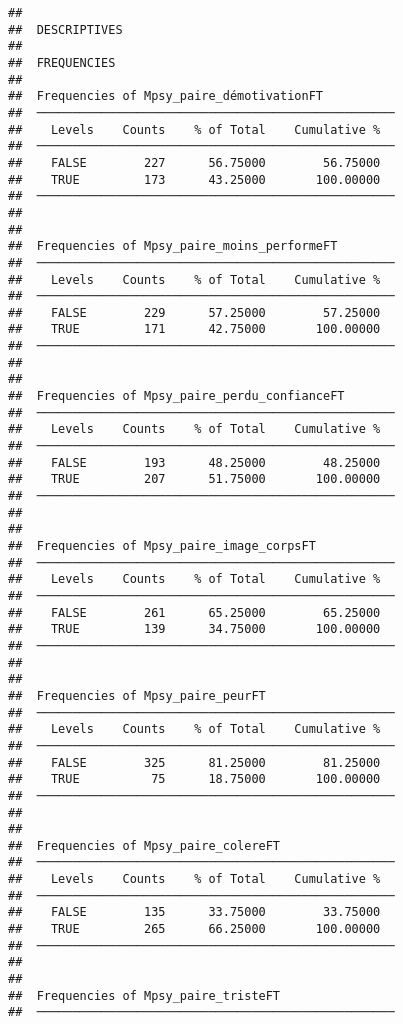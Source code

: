 \documentclass[
]{article}
\begin{document}
\begin{verbatim}
## 
##  DESCRIPTIVES
## 
##  FREQUENCIES
## 
##  Frequencies of Mpsy_paire_démotivationFT           
##  ────────────────────────────────────────────────── 
##    Levels    Counts    % of Total    Cumulative %   
##  ────────────────────────────────────────────────── 
##    FALSE        227      56.75000        56.75000   
##    TRUE         173      43.25000       100.00000   
##  ────────────────────────────────────────────────── 
## 
## 
##  Frequencies of Mpsy_paire_moins_performeFT         
##  ────────────────────────────────────────────────── 
##    Levels    Counts    % of Total    Cumulative %   
##  ────────────────────────────────────────────────── 
##    FALSE        229      57.25000        57.25000   
##    TRUE         171      42.75000       100.00000   
##  ────────────────────────────────────────────────── 
## 
## 
##  Frequencies of Mpsy_paire_perdu_confianceFT        
##  ────────────────────────────────────────────────── 
##    Levels    Counts    % of Total    Cumulative %   
##  ────────────────────────────────────────────────── 
##    FALSE        193      48.25000        48.25000   
##    TRUE         207      51.75000       100.00000   
##  ────────────────────────────────────────────────── 
## 
## 
##  Frequencies of Mpsy_paire_image_corpsFT            
##  ────────────────────────────────────────────────── 
##    Levels    Counts    % of Total    Cumulative %   
##  ────────────────────────────────────────────────── 
##    FALSE        261      65.25000        65.25000   
##    TRUE         139      34.75000       100.00000   
##  ────────────────────────────────────────────────── 
## 
## 
##  Frequencies of Mpsy_paire_peurFT                   
##  ────────────────────────────────────────────────── 
##    Levels    Counts    % of Total    Cumulative %   
##  ────────────────────────────────────────────────── 
##    FALSE        325      81.25000        81.25000   
##    TRUE          75      18.75000       100.00000   
##  ────────────────────────────────────────────────── 
## 
## 
##  Frequencies of Mpsy_paire_colereFT                 
##  ────────────────────────────────────────────────── 
##    Levels    Counts    % of Total    Cumulative %   
##  ────────────────────────────────────────────────── 
##    FALSE        135      33.75000        33.75000   
##    TRUE         265      66.25000       100.00000   
##  ────────────────────────────────────────────────── 
## 
## 
##  Frequencies of Mpsy_paire_tristeFT                 
##  ────────────────────────────────────────────────── 

\end{verbatim}
\end{document}
